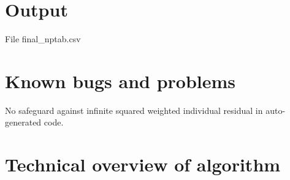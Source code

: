 \section{Output}

File final\_nptab.csv

\section{Known bugs and problems}

No safeguard against infinite squared weighted individual residual in auto-generated code.

\section{Technical overview of algorithm}

